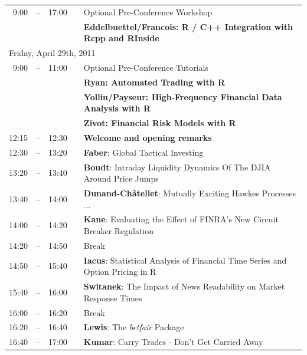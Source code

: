 \documentclass[letterpaper,10pt]{article}
\newcommand{\mylinecolor}[1]{\color{#1}\vspace{-8pt}}  %
\begin{document}
\begin{tabular}{rlrlp{5in}}
 9:00&\color{Breaks}-- & 17:00&   &\small{\mylinecolor{Breaks} Optional Pre-Conference Workshop} \\
     & &      &   &\textbf{\color{Breaks} Eddelbuettel/Francois: R / C++ Integration with Rcpp and RInside} \\[12pt]
\multicolumn{5}{l}{\large \color{Breaks}Friday, April 29th, 2011} \\[10pt]
 9:00&\color{Breaks}-- & 11:00&   &\small{\mylinecolor{Breaks} Optional Pre-Conference Tutorials} \\
     & &      &   &\textbf{\color{Breaks} Ryan: Automated Trading with R} \\
     & &      &   &\textbf{\color{Breaks} Yollin/Payseur: High-Frequency Financial Data Analysis with R} \\
     & &      &   &\textbf{\color{Breaks} Zivot: Financial Risk Models with R} \\
12:15&\color{Breaks}-- & 12:30&   &\textbf{\color{Breaks} Welcome and opening remarks} \\
12:30&\color{Breaks}-- & 13:20&   &\textbf{\color{KeynoteTalk} Faber}: \small{Global Tactical Investing} \\
13:20&\color{Breaks}-- & 13:40&   &\textbf{\color{Talk} Boudt}: \small{Intraday Liquidity Dynamics Of The DJIA Around Price Jumps} \\
13:40&\color{Breaks}-- & 14:00&   &\textbf{\color{Talk} Dunand-Ch\^{a}tellet}: \small{Mutually Exciting Hawkes Processes $\ldots$} \\
14:00&\color{Breaks}-- & 14:20&   &\textbf{\color{Talk} Kane}: \small{Evaluating the Effect of FINRA's New Circuit Breaker Regulation} \\
14:20&\color{Breaks}-- & 14:50&   &\small{\mylinecolor{Breaks} Break} \\
14:50&\color{Breaks}-- & 15:40&   &\textbf{\color{KeynoteTalk} Iacus}: \small{Statistical Analysis of Financial Time Series and Option Pricing in R} \\
15:40&\color{Breaks}-- & 16:00&   &\textbf{\color{Talk} Switanek}: \small{The Impact of News Readability on Market Response Times} \\
16:00&\color{Breaks}-- & 16:20&   &\small{\mylinecolor{Breaks} Break} \\
16:20&\color{Breaks}-- & 16:40&   &\textbf{\color{Talk} Lewis}: \small{The \emph{betfair} Package} \\
16:40&\color{Breaks}-- & 17:00&   &\textbf{\color{Talk} Kumar}: \small{Carry Trades - Don't Get Carried Away} \\

\end{tabular}
\end{document}

